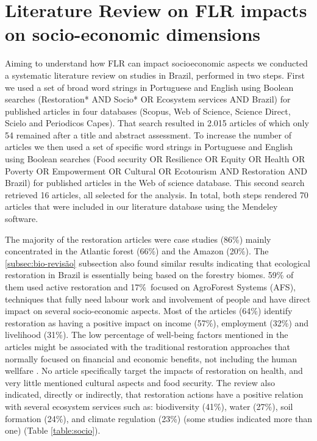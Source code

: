 \section[\Large Literature Review  on socioeconomic dimensions]{Literature Review on FLR impacts on socio-economic dimensions} \label{sec:socio-lit}

Aiming to understand how FLR can impact socioeconomic aspects we conducted a systematic literature review on studies in Brazil, performed in two steps. First we used a set of broad word strings in Portuguese and English using Boolean searches (Restoration* AND Socio* OR Ecosystem services AND Brazil) for published articles in four databases (Scopus, Web of Science, Science Direct, Scielo and Periodicos Capes). That search resulted in 2.015 articles of which only 54 remained after a title and abstract assessment. To increase the number of articles we then used a set of specific word strings in Portuguese and English using Boolean searches (Food security OR Resilience OR Equity OR Health OR Poverty OR Empowerment OR Cultural OR Ecotourism AND Restoration AND Brazil) for published articles in the Web of science database. This second search retrieved 16 articles, all selected for the analysis. In total, both steps rendered 70 articles that were included in our literature database using the Mendeley software.

The majority of the restoration articles were case studies (86\%) mainly concentrated in the Atlantic forest (66\%) and the Amazon (20\%). The \ref{subsec:bio-revisão} subsection also found similar results indicating that ecological restoration in Brazil is essentially being based on the forestry biomes. 59\% of them used active restoration and 17\%\ focused on AgroForest Systems (AFS), techniques that fully need labour work and involvement of people and have direct impact on several socio-economic aspects. Most of the articles (64\%) identify restoration as having a positive impact on income (57\%), employment (32\%) and livelihood (31\%). The low percentage of well-being factors mentioned in the articles might be associated with the traditional restoration approaches that normally focused on financial and economic benefits, not including the human wellfare \cite{Dudley2005ForestContext}. No article specifically target the impacts of restoration on health, and very little mentioned cultural aspects and food security. The review also indicated, directly or indirectly, that restoration actions have a positive relation with several ecosystem services such as: biodiversity (41\%), water (27\%), soil formation (24\%), and climate regulation (23\%) (some studies indicated more than one) (Table \ref{table:socio}).
\newpage

